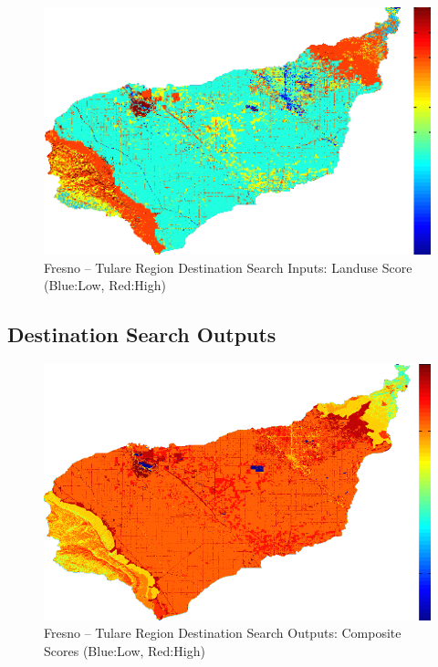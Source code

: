         \begin{figure}[!h]
            \begin{center}
            \includegraphics[width=5.5in]{figures/Fresno_Search_Landuse.png}   
            \caption{Fresno -- Tulare Region Destination Search Inputs: Landuse Score (Blue:Low, Red:High)}
            \label{fig:Fdsinputs_landuse}
            \end{center}
        \end{figure}
    
    \subsection{Destination Search Outputs}
    
        \begin{figure}[!h]
            \begin{center}
            \includegraphics[width=5.5in]{figures/Fresno_Search_Composite.png}   
            \caption{Fresno -- Tulare Region Destination Search Outputs: Composite Scores (Blue:Low, Red:High)}
            \label{fig:Fdsoutputs_comp}
            \end{center}
        \end{figure}
        
